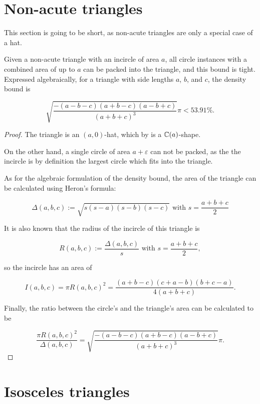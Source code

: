 \documentclass[a4paper,style=print,oneside,bibliography=totoc,nexus,lnum,extramargin]{tubsbook}
\begin{document}
\section{Non-acute triangles}

This section is going to be short, as non-acute triangles are only a special case of a hat.

\begin{theorem}\label{th:tri}
    Given a non-acute triangle with an incircle of area $a$, all circle instances with a combined area of up to $a$ can be packed into the triangle, and this bound is tight. Expressed algebraically, for a triangle with side lengths $a$, $b$, and $c$, the density bound is

    $$\sqrt{\dfrac{-(a-b-c)(a+b-c)(a-b+c)}{(a+b+c)^3}}\pi < 53.91\%.$$
\end{theorem}

\begin{proof}
    The triangle is an $(a,0)$-hat, which by  is a $\mathbb{C}(a)$-shape.

    On the other hand, a single circle of area $a + \varepsilon$ can not be packed, as the the incircle is by definition the largest circle which fits into the triangle.

    As for the algebraic formulation of the density bound, the area of the triangle can be calculated using Heron's formula:

    $$\Delta(a,b,c) := \sqrt{s(s-a)(s-b)(s-c)} \text{ with } s = \frac{a+b+c}{2}$$

    It is also known that the radius of the incircle of this triangle is

    $$R(a,b,c) := \frac{\Delta(a,b,c)}{s} \text{ with } s = \frac{a+b+c}{2},$$

    so the incircle has an area of

    $$I(a,b,c) = \pi R(a,b,c)^2 = \frac{(a+b-c)(c+a-b)(b+c-a)}{4(a+b+c)}.$$

    Finally, the ratio between the circle's and the triangle's area can be calculated to be

    $$\frac{\pi R(a,b,c)^2}{\Delta(a,b,c)} = \sqrt{\dfrac{-(a-b-c)(a+b-c)(a-b+c)}{(a+b+c)^3}}\pi.$$
\end{proof}


\section{Isosceles triangles}
\end{document}
